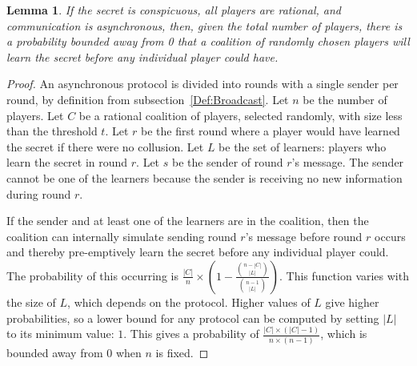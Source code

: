 \documentclass[12pt]{article}
\newtheorem{lemma}{Lemma}
\begin{document}
\begin{lemma}\label{Lem:Async:CoalitionsMayPreempt}If the secret is conspicuous, all players are rational, and communication is asynchronous, then, given the total number of players, there is a probability bounded away from 0 that a coalition of randomly chosen players will learn the secret before any individual player could have.\end{lemma}
\begin{proof}
An asynchronous protocol is divided into rounds with a single sender per round, by definition from subsection~\ref{Def:Broadcast}. 
Let $n$ be the number of players.
Let $C$ be a rational coalition of players, selected randomly, with size less than the threshold $t$.
Let $r$ be the first round where a player would have learned the secret if there were no collusion.
Let $L$ be the set of learners: players who learn the secret in round $r$.
Let $s$ be the sender of round $r$'s message.
The sender cannot be one of the learners because the sender is receiving no new information during round $r$.

If the sender and at least one of the learners are in the coalition, then the coalition can internally simulate sending round $r$'s message before round $r$ occurs and thereby pre-emptively learn the secret before any individual player could. The probability of this occurring is $\frac{|C|}{n} \times \left(1 - \frac{\binom{n - |C|}{|L|}}{\binom{n - 1}{|L|}}\right)$. This function varies with the size of $L$, which depends on the protocol. Higher values of $L$ give higher probabilities, so a lower bound for any protocol can be computed by setting $|L|$ to its minimum value: $1$. This gives a probability of $\frac{|C| \times (|C| - 1)}{n \times (n-1)}$, which is bounded away from $0$ when $n$ is fixed.
\end{proof}
\end{document}
